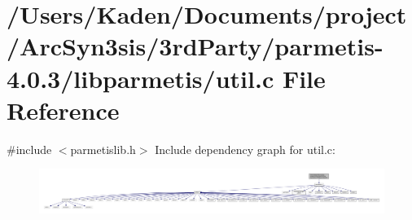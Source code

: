 \hypertarget{a00873}{}\section{/\+Users/\+Kaden/\+Documents/project/\+Arc\+Syn3sis/3rd\+Party/parmetis-\/4.0.3/libparmetis/util.c File Reference}
\label{a00873}
{\ttfamily \#include $<$parmetislib.\+h$>$}\newline
Include dependency graph for util.\+c\+:\nopagebreak
\begin{figure}[H]
\begin{center}
\leavevmode
\includegraphics[width=350pt]{a00874}
\end{center}
\end{figure}
